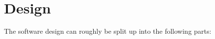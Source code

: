 \chapter{Design}
The software design can roughly be split up into the following parts: \todo{}

\subsection{}